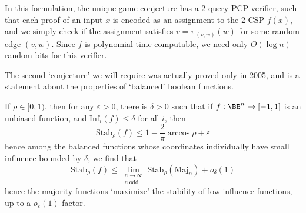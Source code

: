 In this formulation, the unique game conjecture has a 2-query PCP verifier, such that each proof of an input $x$ is encoded as an assignment to the 2-CSP $f(x)$, and we simply check if the assignment satisfies $v = \pi_{(v,w)}(w)$ for some random edge $(v,w)$. Since $f$ is polynomial time computable, we need only $O(\log n)$ random bits for this verifier.

The second `conjecture' we will require was actually proved only in 2005, and is a statement about the properties of `balanced' boolean functions.

\begin{theorem}
    If $\rho \in [0,1)$, then for any $\varepsilon > 0$, there is $\delta > 0$ such that if $f: \BB^n \to [-1,1]$ is an unbiased function, and $\text{Inf}_i(f) \leq \delta$ for all $i$, then
    \[ \text{Stab}_\rho(f) \leq 1 - \frac{2}{\pi} \arccos \rho + \varepsilon \]
    hence among the balanced functions whose coordinates individually have small influence bounded by $\delta$, we find that
    \[ \text{Stab}_\rho(f) \leq \lim_{\substack{n \to \infty\\n\ \text{odd}}} \text{Stab}_\rho(\text{Maj}_n) + o_\delta(1) \]
    hence the majority functions `maximize' the stability of low influence functions, up to a $o_\varepsilon(1)$ factor.
\end{theorem}

